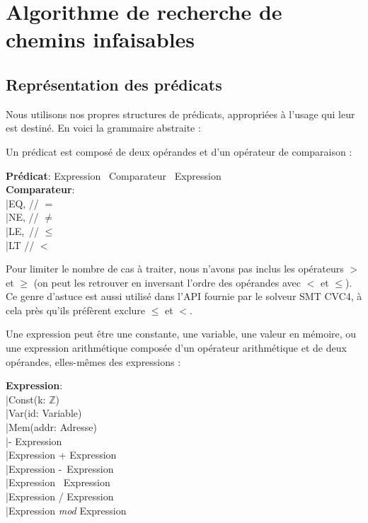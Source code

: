 \documentclass[french]{article}
\begin{document}
  \newpage{}
  \section{Algorithme de recherche de chemins infaisables}  
  \subsection{Représentation des prédicats}
  Nous utilisons nos propres structures de prédicats, appropriées à l'usage qui leur est destiné. En voici la grammaire abstraite :

  Un prédicat est composé de deux opérandes et d'un opérateur de comparaison :
  
  \begin{algorithm}[H]
    \textbf{Prédicat}: Expression \texttimes~Comparateur \texttimes~Expression\\
        \textbf{Comparateur}:\\
            \qquad |\quad EQ, // $=$\\
            \qquad |\quad NE, // $\neq$\\
            \qquad |\quad LE,\, // $\leq$\\
            \qquad |\quad LT\: // $<$\\
  \end{algorithm}
  
  Pour limiter le nombre de cas à traiter, nous n'avons pas inclus les opérateurs $>$ et $\geq$ (on peut les retrouver en inversant l'ordre des opérandes avec $<$ et $\leq$). Ce genre d'astuce est aussi utilisé dans l'API fournie par le solveur SMT CVC4, à cela près qu'ils préfèrent exclure $\leq$ et $<$.
  
  Une expression peut être une constante, une variable, une valeur en mémoire, ou une expression arithmétique composée d'un opérateur arithmétique et de deux opérandes, elles-mêmes des expressions :

  \begin{algorithm}[H]
        \textbf{Expression}:\\
            \qquad |\quad Const(k: $\mathds{Z}$)\\
            \qquad |\quad Var(id: Variable)\\
            \qquad |\quad Mem(addr: Adresse)\\
            \qquad |\quad \-- Expression\\
            \qquad |\quad Expression + Expression\\
            \qquad |\quad Expression \--\ Expression\\
            \qquad |\quad Expression \texttimes\ Expression\\
            \qquad |\quad Expression / Expression\\
            \qquad |\quad Expression \textit{mod} Expression\\
  \end{algorithm}
  
\end{document}

